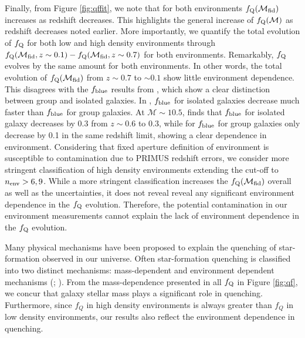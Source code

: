 \documentclass{emulateapj}
\begin{document}
Finally, from Figure \ref{fig:qffit}, we note that for both environments $f_{\rm{Q}}(\mathcal{M}_{\rm{fid}})$ increases as redshift decreases. This highlights the general increase of $f_{\rm{Q}}(\mathcal{M})$ as redshift decreases noted earlier. More importantly, we quantify the total evolution of $f_{\rm{Q}}$ for both low and high density environments through $f_{\rm{Q}}(\mathcal{M}_{\rm{fid}}, z \sim 0.1) - f_{\rm{Q}}(\mathcal{M}_{\rm{fid}}, z \sim 0.7)$ for both environments. Remarkably, $f_{\rm{Q}}$ evolves by the same amount for both environments. In other words, the total evolution of $f_{\rm{Q}}(\mathcal{M}_{\rm{fid}})$ from $z \sim 0.7$ to $\sim 0.1$ show little environment dependence. This disagrees with the $f_{\rm{blue}}$ results from \cite{Iovino:2010aa}, which show a clear distinction between group and isolated galaxies. In \cite{Iovino:2010aa}, $f_{\rm{blue}}$ for isolated galaxies decrease much faster than $f_{\rm{blue}}$ for group galaxies. At $\mathcal{M} \sim 10.5$, \cite{Iovino:2010aa} finds that $f_{\rm{blue}}$ for isolated galaxy decreases by 0.3 from $z \sim 0.6$ to 0.3, while for $f_{\rm{blue}}$ for group galaxies only decrease by 0.1 in the same redshift limit, showing a clear dependence in environment. Considering that fixed aperture definition of environment is susceptible to contamination due to PRIMUS redshift errors, we consider more stringent classification of high density environments extending the cut-off to $n_{\rm{env}} > 6, 9$. While a more stringent classification increases the $f_{\rm{Q}}(\mathcal{M}_{\rm{fid}})$ overall as well as the uncertainties, it does not reveal reveal any significant environment dependence in the $f_{\rm{Q}}$ evolution. Therefore, the potential contamination in our environment measurements cannot explain the lack of environment dependence in the $f_{\rm{Q}}$ evolution. 

Many physical mechanisms have been proposed to explain the quenching of star-formation observed in our universe. Often star-formation quenching is classified into two distinct mechanisms: mass-dependent and environment dependent mechanisms (\cite{Baldry:2006aa}; \cite{Peng:2010aa}). From the mass-dependence presented in all $f_{\rm{Q}}$ in Figure \ref{fig:qf}, we concur that galaxy stellar mass plays a significant role in quenching. Furthermore, since $f_Q$ in high density environments is always greater than $f_Q$ in low density environments, our results also reflect the environment dependence in quenching. %
\end{document}

